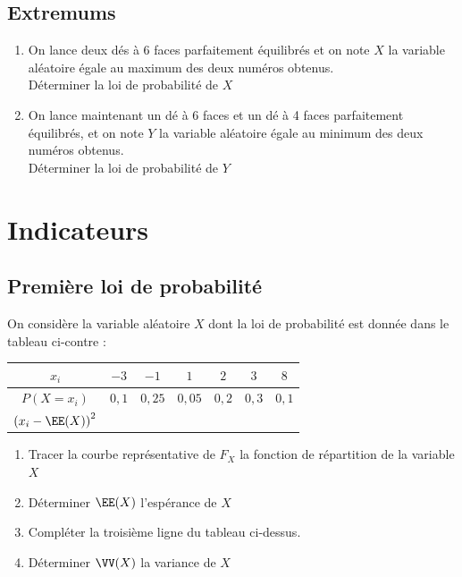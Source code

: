 \documentclass[oneside,12pt]{book}          %
\begin{document}
\subsection{Extremums}
\begin{enumerate}
    \item On lance deux dés à 6 faces parfaitement équilibrés et on note $X$ la variable aléatoire égale au maximum des deux numéros obtenus.\\
    Déterminer la loi de probabilité de $X$
    \item On lance maintenant un dé à 6 faces et un dé à 4 faces parfaitement équilibrés, et on note $Y$ la variable aléatoire égale au minimum des deux numéros obtenus.\\
    Déterminer la loi de probabilité de $Y$
\end{enumerate}



\section{Indicateurs}

\subsection{Première loi de probabilité}
On considère la variable aléatoire $X$ dont la loi de probabilité est donnée dans le tableau ci-contre : 

\begin{center}
\renewcommand{\arraystretch}{1.5} 
\setlength{\tabcolsep}{15pt}
\begin{tabular}{|c|c|c|c|c|c|c|}  \hline
    $x_i$ & $-3$ & $-1$ & $1$ & $2$ & $3$ & $8$ \\ \hline
    $P(X=x_i)$ & $0,1$ & $0,25$ & $0,05$ & $0,2$ & $0,3$ & $0,1$ \\ \hline
    $\left(x_i-\EE(X)\right)^2$ & & & & & & \\ \hline
\end{tabular}
\end{center}
\begin{enumerate}
	\item Tracer la courbe représentative de $F_X$ la fonction de répartition de la variable $X$
    \item Déterminer $\EE(X)$ l'espérance de $X$
    \item Compléter la troisième ligne du tableau ci-dessus.
    \item Déterminer $\VV(X)$ la variance de $X$
\end{enumerate}
\end{document}

